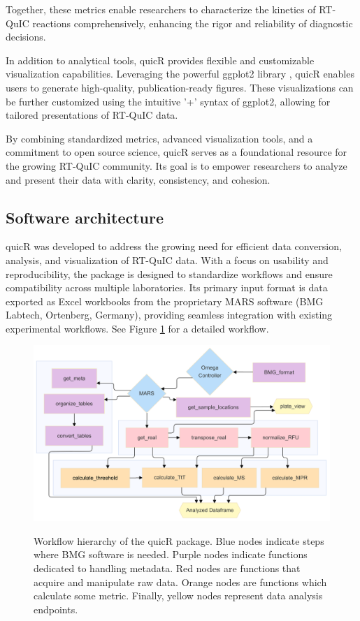 \documentclass[preprint,12pt, a4paper]{elsarticle}
\begin{document}
    Together, these metrics enable researchers to characterize the kinetics of RT-QuIC reactions comprehensively, enhancing the rigor and reliability of diagnostic decisions.

    In addition to analytical tools, quicR provides flexible and customizable visualization capabilities. Leveraging the powerful ggplot2 library \cite{ggplot2016}, quicR enables users to generate high-quality, publication-ready figures. These visualizations can be further customized using the intuitive '+' syntax of ggplot2, allowing for tailored presentations of RT-QuIC data.

    By combining standardized metrics, advanced visualization tools, and a commitment to open source science, quicR serves as a foundational resource for the growing RT-QuIC community. Its goal is to empower researchers to analyze and present their data with clarity, consistency, and cohesion.

\subsection{Software architecture}
    quicR was developed to address the growing need for efficient data conversion, analysis, and visualization of RT-QuIC data. With a focus on usability and reproducibility, the package is designed to standardize workflows and ensure compatibility across multiple laboratories. Its primary input format is data exported as Excel workbooks from the proprietary MARS software (BMG Labtech, Ortenberg, Germany), providing seamless integration with existing experimental workflows. See Figure \ref{fig:workflow} for a detailed workflow.
    \begin{figure}[ht]
        \caption{Workflow hierarchy of the quicR package. Blue nodes indicate steps where BMG software is needed. Purple nodes indicate functions dedicated to handling metadata. Red nodes are functions that acquire and manipulate raw data. Orange nodes are functions which calculate some metric. Finally, yellow nodes represent data analysis endpoints.}
        \centering
        \includegraphics[width=\textwidth]{images/workflow2.png}
        \label{fig:workflow}
    \end{figure}
\end{document}
